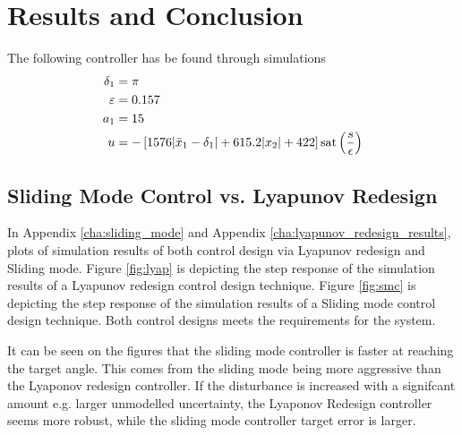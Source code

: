 \section{Results and Conclusion} %
\label{sec:results_and_conclusion}
The following controller has be found through simulations
\begin{equation}
\begin{split}
        \delta_1 &= \pi \\
        \varepsilon &= 0.157\\
        a_1 &= 15 \\
        u &=  -\left[ 1576 \vert \bar{x}_1-\delta_1 \vert + 615.2\vert x_2 \vert + 422 \right]\mathrm{sat}\left(\frac{s}{\epsilon}\right)\nonumber \\
\end{split}
\end{equation}

\subsection{Sliding Mode Control vs. Lyapunov Redesign} %
\label{sub:sliding_mode_control_vs_lyapunov_redesign}
In Appendix \ref{cha:sliding_mode} and Appendix \ref{cha:lyapunov_redesign_results}, plots of simulation results of both
control design via Lyapunov redesign and Sliding mode. Figure \ref{fig:lyap} is depicting the step response of the
simulation results of a Lyapunov redesign control design technique. Figure \ref{fig:smc} is depicting the step response
of the simulation results of a Sliding mode control design technique. Both control designs meets the requirements for the
system.

It can be seen on the figures that the sliding mode controller is faster at reaching the target angle. This comes from the sliding mode being more aggressive than the Lyaponov redesign controller. If the disturbance is increased with a signifcant amount e.g. larger unmodelled uncertainty, the Lyaponov Redesign controller seems more robust, while the sliding mode controller target error is larger.